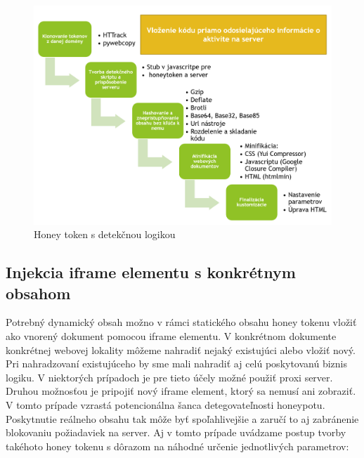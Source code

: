 \documentclass[conference, 11pt,slovak,a4paper,twoside]{IEEEtran}
\begin{document}
\begin{figure}[!t]  %
					\begin{center}
									\includegraphics[width=\linewidth]{fig/senderCodeToken.png}
									\caption{Honey token s detekčnou logikou}
									\label{senderCodeToken}
					\end{center}
\end{figure}



\subsection{Injekcia iframe elementu s konkrétnym obsahom} \label{injectionOfIframeElement}

Potrebný dynamický obsah možno v rámci statického obsahu honey tokenu vložiť ako vnorený dokument pomocou iframe elementu. V konkrétnom dokumente konkrétnej webovej lokality môžeme nahradiť nejaký existujúci alebo vložiť nový. Pri nahradzovaní existujúceho by sme mali nahradiť aj celú poskytovanú biznis logiku. V niektorých prípadoch je pre tieto účely možné použiť proxi server. Druhou možnosťou je pripojiť nový iframe element, ktorý sa nemusí ani zobraziť. V tomto prípade vzrastá potencionálna šanca detegovateľnosti honeypotu. Poskytnutie reálneho obsahu tak môže byť spoľahlivejšie a zaručí to aj zabránenie blokovaniu požiadaviek na server. Aj v tomto prípade uvádzame postup tvorby takéhoto honey tokenu s dôrazom na náhodné určenie jednotlivých parametrov:
\end{document}
